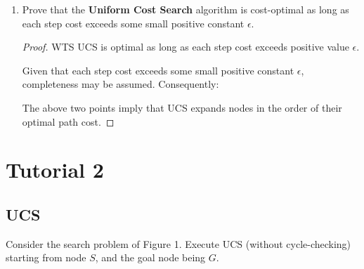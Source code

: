\begin{enumerate}
    \item Prove that the \textbf{Uniform Cost Search} algorithm is cost-optimal as long as each step cost exceeds some small positive constant $\epsilon$.

    \begin{solution}
        \begin{proof}
            WTS UCS is optimal as long as each step cost exceeds positive value $\epsilon$. 

            Given that each step cost exceeds some small positive constant $\epsilon$, completeness may be assumed. Consequently:


            The above two points imply that UCS expands nodes in the order of their optimal path cost.
        \end{proof}
    \end{solution}
\end{enumerate}

\newpage
\section*{Tutorial 2}

\subsection*{UCS}

Consider the search problem of Figure 1. Execute UCS (without cycle-checking) starting from node $S$, and the goal node being $G$.

